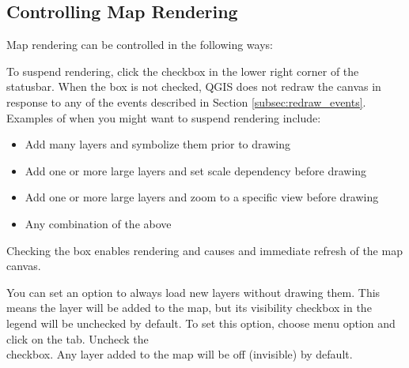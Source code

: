 \subsection{Controlling Map Rendering}\label{label_controlmap}

Map rendering can be controlled in the following ways:

\label{label_suspendrender}

To suspend rendering, click the  checkbox in the lower right
corner of the statusbar. When the  box is not checked, QGIS
does not redraw the canvas in response to any of the events described in
Section \ref{subsec:redraw_events}. Examples of when you might want to suspend
rendering include:

\begin{itemize}
\item Add many layers and symbolize them prior to drawing
\item Add one or more large layers and set scale dependency before drawing
\item Add one or more large layers and zoom to a specific view before drawing
\item Any combination of the above
\end{itemize}

Checking the  box enables rendering and causes and immediate
refresh of the map canvas.

\label{label_settinglayer}

You can set an option to always load new layers without drawing them. This
means the layer will be added to the map, but its visibility checkbox in the
legend will be unchecked by default. To set this option, choose
menu option  \arrow {} and click on the
 tab. Uncheck the \\
 checkbox.
Any layer added to the map will be off (invisible) by default.

%
%


